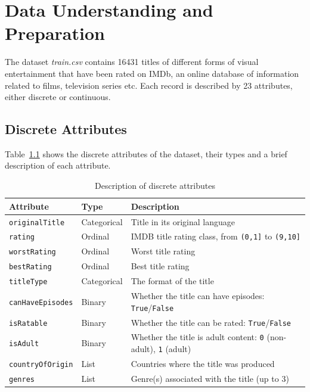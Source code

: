 \chapter{Data Understanding and Preparation}
\label{ch:capitolo1}

The dataset \textit{train.csv} contains 16431 titles of different forms of visual entertainment that have been rated on IMDb, 
an online database of information related to films, television series etc. 
Each record is described by 23 attributes, either discrete or continuous.

\section{Discrete Attributes}
Table~\ref{tab:attributes} shows the discrete attributes of the dataset,
their types and a brief description of each attribute.
\begin{table}[h]
\centering
\begin{tabular}{lll}
\toprule
\textbf{Attribute} & \textbf{Type} & \textbf{Description} \\
\midrule
\texttt{originalTitle} & Categorical & Title in its original language \\
\texttt{rating} & Ordinal & IMDB title rating class, from \texttt{(0,1]} to \texttt{(9,10]} \\
\texttt{worstRating} & Ordinal & Worst title rating \\
\texttt{bestRating} & Ordinal & Best title rating \\
\texttt{titleType} & Categorical & The format of the title \\
\texttt{canHaveEpisodes} & Binary & Whether the title can have episodes: \texttt{True}/\texttt{False} \\
\texttt{isRatable} & Binary & Whether the title can be rated: \texttt{True}/\texttt{False} \\
\texttt{isAdult} & Binary & Whether the title is adult content: \texttt{0} (non-adult), \texttt{1} (adult) \\
\texttt{countryOfOrigin} & List & Countries where the title was produced \\
\texttt{genres} & List & Genre(s) associated with the title (up to 3) \\
\bottomrule
\end{tabular}
\caption{Description of discrete attributes}
\label{tab:attributes}
\end{table}

